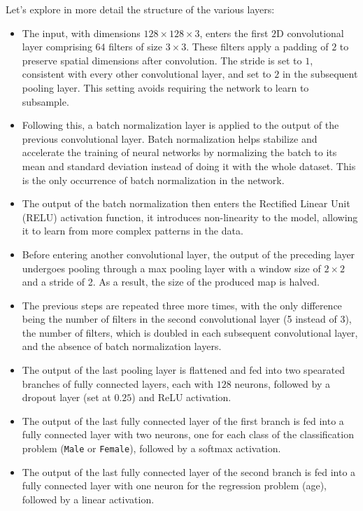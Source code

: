Let's explore in more detail the structure of the various layers:
\begin{itemize}
    \item The input, with dimensions $128\times128\times3$, enters
    the first $2$D convolutional layer comprising $64$ filters of size $3\times3$.
    These filters apply a padding of $2$ to preserve spatial dimensions
    after convolution. The stride is set to $1$, consistent with every
    other convolutional layer, and set to $2$ in the subsequent 
    pooling layer. This setting avoids requiring the network to learn
    to subsample.
    \item Following this, a batch normalization layer is applied
    to the output of the previous convolutional layer.
    Batch normalization helps stabilize and accelerate
    the training of neural networks by normalizing the batch to its
    mean and standard deviation instead of doing it with the whole dataset.
    This is the only occurrence of batch normalization in the network.
    \item The output of the batch normalization then enters
    the Rectified Linear Unit (RELU) activation function,
    it introduces non-linearity to the model,
    allowing it to learn from more complex patterns in the data.
    \item Before entering another convolutional layer,
    the output of the preceding layer undergoes pooling through
    a max pooling layer with a window size of $2\times2$ and a stride of 2.
    As a result, the size of the produced map is halved.
    \item The previous steps are repeated three more times,
    with the only difference being the number of filters in the
    second convolutional layer (5 instead of 3), the number of filters,
    which is doubled in each subsequent convolutional layer,
    and the absence of batch normalization layers.
    \item The output of the last pooling layer is flattened
    and fed into two spearated branches of fully connected layers,
    each with $128$ neurons,
    followed by a dropout layer (set at $0.25$) and ReLU activation.
    \item The output of the last fully connected layer of the first branch
    is fed into a fully connected layer with two neurons,
    one for each class of the classification problem
    (\texttt{Male} or \texttt{Female}), followed by a softmax activation.
    \item The output of the last fully connected layer of the second branch
    is fed into a fully connected layer with one neuron
    for the regression problem (age), followed by a linear activation.
\end{itemize}

